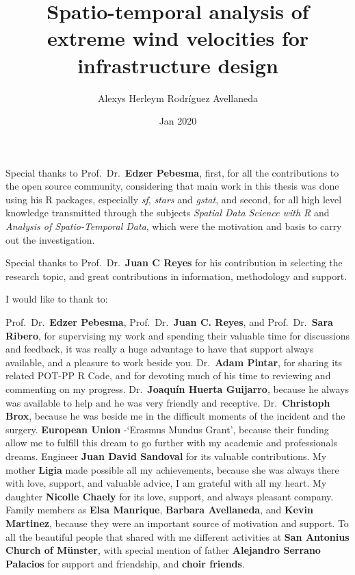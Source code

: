 \documentclass[12pt,oneside]{reedthesis}
\title{Spatio-temporal analysis of extreme wind velocities for infrastructure design}
\author{Alexys Herleym Rodríguez Avellaneda}
\date{Jan 2020}
\begin{document}
  \maketitle

\frontmatter %
\pagestyle{empty} %
  \begin{acknowledgements}
    Special thanks to Prof.~Dr.~\textbf{Edzer Pebesma}, first, for all the contributions to the open source community, considering that main work in this thesis was done using his R packages, especially \emph{sf}, \emph{stars} and \emph{gstat}, and second, for all high level knowledge transmitted through the subjects \emph{Spatial Data Science with R} and \emph{Analysis of Spatio-Temporal Data}, which were the motivation and basis to carry out the investigation.
    
    \par
    
    Special thanks to Prof.~Dr.~\textbf{Juan C Reyes} for his contribution in selecting the research topic, and great contributions in information, methodology and support.
    
    \par
    
    I would like to thank to:
    
    \par
    
    Prof.~Dr.~\textbf{Edzer Pebesma}, Prof.~Dr.~\textbf{Juan C. Reyes}, and Prof.~Dr.~\textbf{Sara Ribero}, for supervising my work and spending their valuable time for discussions and feedback, it was really a huge advantage to have that support always available, and a pleasure to work beside you. Dr.~\textbf{Adam Pintar}, for sharing its related POT-PP R Code, and for devoting much of his time to reviewing and commenting on my progress. Dr.~\textbf{Joaquín Huerta Guijarro}, because he always was available to help and he was very friendly and receptive. Dr.~\textbf{Christoph Brox}, because he was beside me in the difficult moments of the incident and the surgery. \textbf{European Union} -`Erasmus Mundus Grant', because their funding allow me to fulfill this dream to go further with my academic and professionals dreams. Engineer \textbf{Juan David Sandoval} for its valuable contributions. My mother \textbf{Ligia} made possible all my achievements, because she was always there with love, support, and valuable advice, I am grateful with all my heart. My daughter \textbf{Nicolle Chaely} for its love, support, and always pleasant company. Family members as \textbf{Elsa Manrique}, \textbf{Barbara Avellaneda}, and \textbf{Kevin Martinez}, because they were an important source of motivation and support. To all the beautiful people that shared with me different activities at \textbf{San Antonius Church of Münster}, with special mention of father \textbf{Alejandro Serrano Palacios} for support and friendship, and \textbf{choir friends}.
  \end{acknowledgements}
\end{document}
